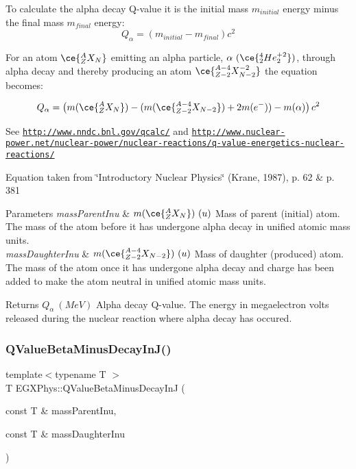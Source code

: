 To calculate the alpha decay Q-\/value it is the initial mass $m_{initial}$ energy minus the final mass $m_{final}$ energy\+: \[Q_{\alpha} = \left ( m_{initial}-m_{final}\right ) c^2\]

For an atom $\ce{ ^{A}_{Z}X_{N} }$ emitting an alpha particle, $\alpha\ (\ce{ ^{4}_{2}He^{+2}_{2} })$, through alpha decay and thereby producing an atom $\ce{ ^{A-4}_{Z{-2}}X^{-2}_{N-2} }$ the equation becomes\+:

\[Q_{\alpha} = \left ( m(\ce{ ^{A}_{Z}X_{N} }) - (m(\ce{ ^{A-4}_{Z{-2}}X_{N-2} }) + 2m(e^-)) - m(\alpha)\right ) c^2\]

See \href{http://www.nndc.bnl.gov/qcalc/}{\tt http\+://www.\+nndc.\+bnl.\+gov/qcalc/} and \href{http://www.nuclear-power.net/nuclear-power/nuclear-reactions/q-value-energetics-nuclear-reactions/}{\tt http\+://www.\+nuclear-\/power.\+net/nuclear-\/power/nuclear-\/reactions/q-\/value-\/energetics-\/nuclear-\/reactions/}

Equation taken from \char`\"{}\+Introductory Nuclear Physics\char`\"{} (Krane, 1987), p. 62 \& p. 381


\begin{DoxyParams}{Parameters}
{\em mass\+Parent\+Inu} & $m(\ce{ ^{A}_{Z}X_{N} })\ (u)$ Mass of parent (initial) atom. The mass of the atom before it has undergone alpha decay in unified atomic mass units. \\
\hline
{\em mass\+Daughter\+Inu} & $m(\ce{ ^{A-4}_{Z{-2}}X_{N-2} })\ (u)$ Mass of daughter (produced) atom. The mass of the atom once it has undergone alpha decay and charge has been added to make the atom neutral in unified atomic mass units. \\
\hline
\end{DoxyParams}
\begin{DoxyReturn}{Returns}
$Q_{\alpha}\ (MeV)$ Alpha decay Q-\/value. The energy in megaelectron volts released during the nuclear reaction where alpha decay has occured. 
\end{DoxyReturn}
\mbox{\label{group___q_value_ga4a2ab24ffb317abc97ce46c92bb64c3c}} 
\subsubsection{\texorpdfstring{Q\+Value\+Beta\+Minus\+Decay\+In\+J()}{QValueBetaMinusDecayInJ()}}
{\footnotesize\ttfamily template$<$typename T $>$ \\
T E\+G\+X\+Phys\+::\+Q\+Value\+Beta\+Minus\+Decay\+InJ (\begin{DoxyParamCaption}\item[{const T \&}]{mass\+Parent\+Inu,  }\item[{const T \&}]{mass\+Daughter\+Inu }\end{DoxyParamCaption})}



